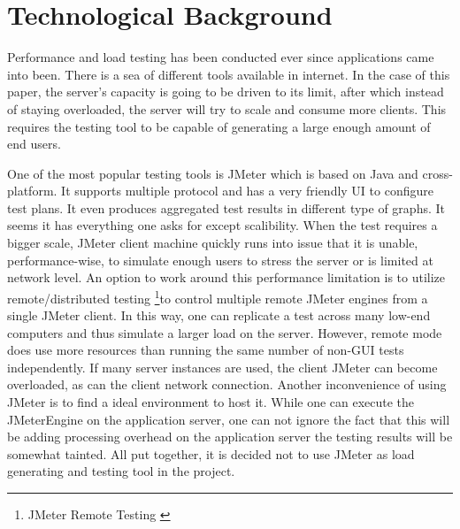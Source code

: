 \chapter{Technological Background}
Performance and load testing has been conducted ever since applications came into been. There is a sea of different tools available in internet. In the case of this paper, the server's capacity is going to be driven to its limit, after which instead of staying overloaded, the server will try to scale and consume more clients. This requires the testing tool to be capable of generating a large enough amount of end users. 

One of the most popular testing tools is JMeter which is based on Java and cross-platform. It supports multiple protocol and has a very friendly UI to configure test plans. It even produces aggregated test results in different type of graphs. It seems it has everything one asks for except scalibility. When the test requires a bigger scale, JMeter client machine quickly runs into issue that it is unable, performance-wise, to simulate enough users to stress the server or is limited at network level. An option to work around this performance limitation is to utilize remote/distributed testing \footnote{JMeter Remote Testing \cite{JMeterRemote}}to control multiple remote JMeter engines from a single JMeter client. In this way, one can replicate a test across many low-end computers and thus simulate a larger load on the server. However, remote mode does use more resources than running the same number of non-GUI tests independently. If many server instances are used, the client JMeter can become overloaded, as can the client network connection. Another inconvenience of using JMeter is to find a ideal environment to host it. While one can execute the JMeterEngine on the application server, one can not ignore the fact that this will be adding processing overhead on the application server the testing results will be somewhat tainted. All put together, it is decided not to use JMeter as load generating and testing tool in the project. 





  

